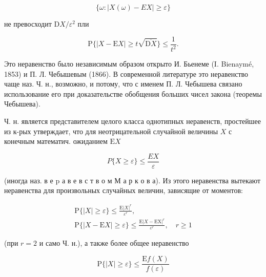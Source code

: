 \documentclass[10pt]{article}
\begin{document}
\[

\{\omega:|X(\omega)-E X| \geqslant \varepsilon\}

\]



не превосходит $\mathrm{D} X / \varepsilon^{2}$ пли



\[

\mathrm{P}\{|X-\mathrm{E} X| \geqslant t \sqrt{\overline{\mathrm{D} X}}\} \leqslant \frac{1}{t^{2}} .

\]



Это неравенство было независимым образом открыто И. Бьенеме (I. Bienaymé, 1853) и П. Л. Чебышевым (1866). В современной литературе это неравенство чаще наз. Ч. н., возможно, и потому, что с именем П. Л. Чебышева связано использование его при доказательстве обобщения больших чисел закона (теоремы Чебышева).



Ч. н. является представителем целого класса однотипных неравенств, простейшее из к-рых утверждает, что для неотрицательной случайной величины $X$ с конечным математич. ожиданием $\mathrm{E} X$



\[

P\{X \geqslant \varepsilon\} \leqslant \frac{E X}{\varepsilon}

\]



(иногда наз. в е $\mathrm{p}$ а в е в с т в о м М а р к о в а). Из этого неравенства вытекают неравенства для произвольных случайных величин, зависящие от моментов:



\[

\begin{gathered}

\mathrm{P}\{|X| \geqslant \varepsilon\} \leqslant \frac{\mathrm{E}|X|^{r}}{\varepsilon^{r}}, \\

\mathrm{P}\{|X-\mathrm{E} X| \geqslant \varepsilon\} \leqslant \frac{\mathrm{E}|X-\mathrm{EX}|^{r}}{\varepsilon^{r}}, \quad r \geqslant 1

\end{gathered}

\]



(при $r=2$ и само Ч. н.), а также более общее неравенство



\[

\mathrm{P}\{|X| \geqslant \varepsilon\} \leqslant \frac{\mathrm{E} f(X)}{f(\varepsilon)}

\]
\end{document}
